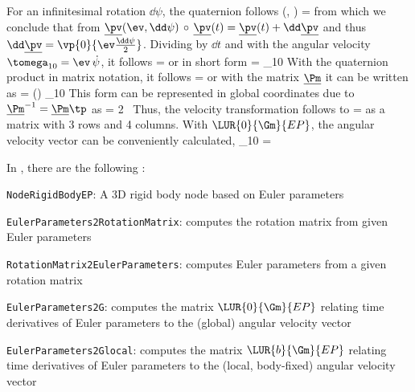 \noindent For an infinitesimal rotation $\dd \psi$, the quaternion follows
\be
  \underline{\pv}(\ev, \dd \psi) =  \approx 
\ee
from which we conclude that from $\underline{\pv}(\ev, \dd \psi) \, \circ \, \underline{\pv}(t) = \underline{\pv}(t) + \dd\underline{\pv}$ and thus $\dd\underline{\pv} = \vp{0}{\ev \frac{\dd\psi}{2}}$.
Dividing by $\dd t$ and with the angular velocity $\tomega_{10} = \ev \, \dot \psi$, it follows
\be
   =    \circ \vp{\ps}{\pv}
\ee
or in short form
\be
   =  \underline{\tomega}_{10}  \circ \underline{\pv}
\ee
With the quaternion product in matrix notation, it follows
\be
   =   
\ee
or with the matrix $\underline{\Pm}$ it can be written as
\be
   =  {\underline{\Pm}}(\pv) \underline{\tomega}_{10}    
\ee
This form can be represented in global coordinates due to ${\underline{\Pm}}^{-1} = {\underline{\Pm}}\tp$ as
\be
   = 2  \, 
\ee
Thus, the velocity transformation follows to
\be
   = 
\ee
as a matrix with 3 rows and 4 columns. With $\LUR{0}{\Gm}{EP}$, the angular velocity vector can be conveniently calculated,
\be
  _{10} =  \, 
\ee

\noindent In \codeName, there are the following :
\bi
  \item \texttt{NodeRigidBodyEP}: A 3D rigid body node based on Euler parameters
  \item \texttt{EulerParameters2RotationMatrix}: computes the rotation matrix from given Euler parameters
  \item \texttt{RotationMatrix2EulerParameters}: computes Euler parameters from a given rotation matrix
  \item \texttt{EulerParameters2G}: computes the matrix $\LUR{0}{\Gm}{EP}$ relating time derivatives of Euler parameters to the (global) angular velocity vector
  \item \texttt{EulerParameters2Glocal}: computes the matrix $\LUR{b}{\Gm}{EP}$ relating time derivatives of Euler parameters to the (local, body-fixed) angular velocity vector
\ei



